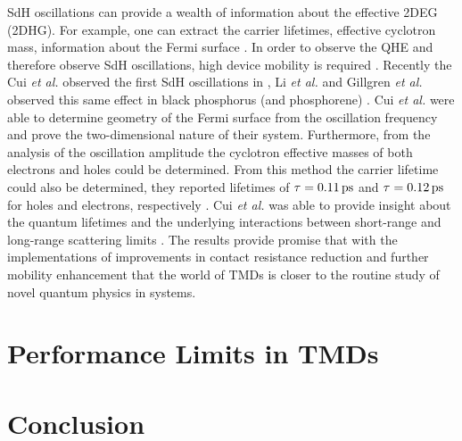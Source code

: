 \noindent \acs{SdH} oscillations can provide a wealth of information about the effective \acs{2DEG} (\acs{2DHG}). For example, one can extract the carrier lifetimes, effective cyclotron mass, information about the Fermi surface \cite{Li_NatureNano2015}. In order to observe the \acs{QHE} and therefore observe \acs{SdH} oscillations, high device mobility is required \cite{Das_Wiley1996,Tsukazak_Science2007}. Recently the Cui \emph{et al.} observed the first \acs{SdH} oscillations in , Li \emph{et al.} and Gillgren \emph{et al.} observed this same effect in black phosphorus (and phosphorene) \cite{Cui_NatureNano2015,Li_NatureNano2015,Gillgren_2DMat2015}. Cui \emph{et al.} were able to determine geometry of the Fermi surface from the oscillation frequency and prove the two-dimensional nature of their system. Furthermore, from the analysis of the oscillation amplitude the cyclotron effective masses of both electrons and holes could be determined. From this method the carrier lifetime could also be determined, they reported lifetimes of $\tau = 0.11\,\mathrm{ps}$ and $\tau = 0.12\,\mathrm{ps}$ for holes and electrons, respectively \cite{Li_NatureNano2015,Shoenberg_Magnet1984}. Cui \emph{et al.} was able to provide insight about the quantum lifetimes and the underlying interactions between short-range and long-range scattering limits \cite{Cui_NatureNano2015}. The results provide promise that with the implementations of improvements in contact resistance reduction and further mobility enhancement that the world of \acp{TMD} is closer to the routine study of novel quantum physics in \td systems. 

\section{Performance Limits in \acp{TMD}}\label{sec:performance_limits}

\section{Conclusion}\label{sec:conclusion}